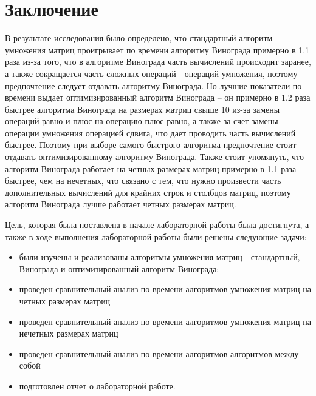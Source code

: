 \chapter*{Заключение}

В результате исследования было определено, что стандартный алгоритм умножения матриц проигрывает по времени алгоритму Винограда примерно в 1.1 раза из-за того, что в алгоритме Винограда часть вычислений происходит заранее, а также сокращается часть сложных операций - операций умножения, поэтому предпочтение следует отдавать алгоритму Винограда. 
Но лучшие показатели по времени выдает оптимизированный алгоритм Винограда -- он примерно в 1.2 раза быстрее алгоритма Винограда на размерах матриц свыше 10 из-за замены операций равно и плюс на операцию плюс-равно, а также за счет замены операции умножения операцией сдвига, что дает проводить часть вычислений быстрее. 
Поэтому при выборе самого быстрого алгоритма предпочтение стоит отдавать оптимизированному алгоритму Винограда. 
Также стоит упомянуть, что алгоритм Винограда работает на четных размерах матриц примерно в 1.1 раза быстрее, чем на нечетных, что связано с тем, что нужно произвести часть дополнительных вычислений для крайних строк и столбцов матриц, поэтому алгоритм Винограда лучше работает четных размерах матриц.


Цель, которая была поставлена в начале лабораторной работы была достигнута, а также в ходе выполнения лабораторной работы были решены следующие задачи:

\begin{itemize}
	\item были изучены и реализованы алгоритмы умножения матриц - стандартный, Винограда и оптимизированный алгоритм Винограда;
    \item проведен сравнительный анализ по времени алгоритмов умножения матриц на четных размерах матриц
	\item проведен сравнительный анализ по времени алгоритмов умножения матриц на нечетных размерах матриц
	\item проведен сравнительный анализ по времени алгоритмов алгоритмов между собой
	\item подготовлен отчет о лабораторной работе.
\end{itemize}